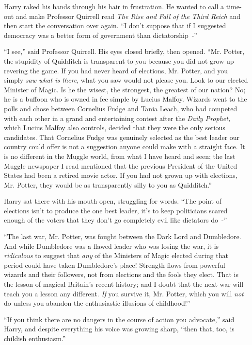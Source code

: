 Harry raked his hands through his hair in frustration. He wanted to call a time-out and make Professor Quirrell read \emph{The Rise and Fall of the Third Reich} and then start the conversation over again. ``I don't suppose that if I suggested democracy was a better form of government than dictatorship~-''

``I see,'' said Professor Quirrell. His eyes closed briefly, then opened. ``Mr. Potter, the stupidity of Quidditch is transparent to you because you did not grow up revering the game. If you had never heard of elections, Mr. Potter, and you simply \emph{saw what is there}, what you saw would not please you. Look to our elected Minister of Magic. Is he the wisest, the strongest, the greatest of our nation? No; he is a buffoon who is owned in fee simple by Lucius Malfoy. Wizards went to the polls and chose between Cornelius Fudge and Tania Leach, who had competed with each other in a grand and entertaining contest after the \emph{Daily Prophet,} which Lucius Malfoy also controls, decided that they were the only serious candidates. That Cornelius Fudge was genuinely selected as the best leader our country could offer is not a suggestion anyone could make with a straight face. It is no different in the Muggle world, from what I have heard and seen; the last Muggle newspaper I read mentioned that the previous President of the United States had been a retired movie actor. If you had not grown up with elections, Mr. Potter, they would be as transparently silly to you as Quidditch.''

Harry sat there with his mouth open, struggling for words. ``The point of elections isn't to produce the one best leader, it's to keep politicians scared enough of the voters that they don't go completely evil like dictators do~-''

``The last war, Mr. Potter, was fought between the Dark Lord and Dumbledore. And while Dumbledore was a flawed leader who was losing the war, it is \emph{ridiculous} to suggest that \emph{any} of the Ministers of Magic elected during that period could have taken Dumbledore's place! Strength flows from powerful wizards and their followers, not from elections and the fools they elect. That is the lesson of magical Britain's recent history; and I doubt that the next war will teach you a lesson any different. \emph{If} you survive it, Mr. Potter, which you will \emph{not} do unless you abandon the enthusiastic illusions of childhood!''

``If you think there are no dangers in the course of action you advocate,'' said Harry, and despite everything his voice was growing sharp, ``then that, too, is childish enthusiasm.''

